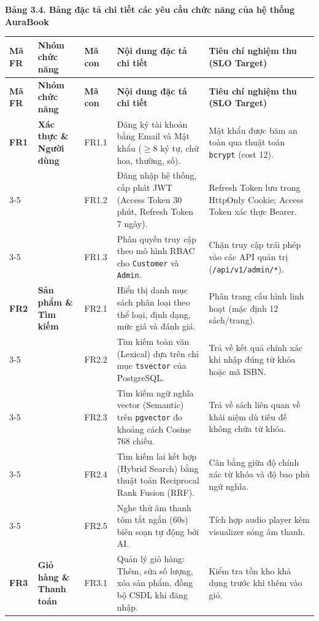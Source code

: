 \documentclass[11pt, a4paper]{report}
\begin{document}
\vspace{0.3cm}
\noindent\textbf{Bảng 3.4. Bảng đặc tả chi tiết các yêu cầu chức năng của hệ thống AuraBook}

\begin{longtable}{p{1.0cm} p{3.0cm} p{1.0cm} p{5.0cm} p{4.0cm}}
\toprule
\textbf{Mã FR} & \textbf{Nhóm chức năng} & \textbf{Mã con} & \textbf{Nội dung đặc tả chi tiết} & \textbf{Tiêu chí nghiệm thu (SLO Target)} \\
\midrule
\endfirsthead
\toprule
\textbf{Mã FR} & \textbf{Nhóm chức năng} & \textbf{Mã con} & \textbf{Nội dung đặc tả chi tiết} & \textbf{Tiêu chí nghiệm thu (SLO Target)} \\
\midrule
\endhead
\bottomrule
\endfoot
\textbf{FR1} & \textbf{Xác thực \& Người dùng} & FR1.1 & Đăng ký tài khoản bằng Email và Mật khẩu ($\ge 8$ ký tự, chữ hoa, thường, số). & Mật khẩu được băm an toàn qua thuật toán \texttt{bcrypt} (cost 12). \\
\cmidrule{3-5}
& & FR1.2 & Đăng nhập hệ thống, cấp phát JWT (Access Token 30 phút, Refresh Token 7 ngày). & Refresh Token lưu trong HttpOnly Cookie; Access Token xác thực Bearer. \\
\cmidrule{3-5}
& & FR1.3 & Phân quyền truy cập theo mô hình RBAC cho \texttt{Customer} và \texttt{Admin}. & Chặn truy cập trái phép vào các API quản trị (\texttt{/api/v1/admin/*}). \\
\midrule
\textbf{FR2} & \textbf{Sản phẩm \& Tìm kiếm} & FR2.1 & Hiển thị danh mục sách phân loại theo thể loại, định dạng, mức giá và đánh giá. & Phân trang cấu hình linh hoạt (mặc định 12 sách/trang). \\
\cmidrule{3-5}
& & FR2.2 & Tìm kiếm toàn văn (Lexical) dựa trên chỉ mục \texttt{tsvector} của PostgreSQL. & Trả về kết quả chính xác khi nhập đúng từ khóa hoặc mã ISBN. \\
\cmidrule{3-5}
& & FR2.3 & Tìm kiếm ngữ nghĩa vector (Semantic) trên \texttt{pgvector} đo khoảng cách Cosine 768 chiều. & Trả về sách liên quan về khái niệm dù tiêu đề không chứa từ khóa. \\
\cmidrule{3-5}
& & FR2.4 & Tìm kiếm lai kết hợp (Hybrid Search) bằng thuật toán Reciprocal Rank Fusion (RRF). & Cân bằng giữa độ chính xác từ khóa và độ bao phủ ngữ nghĩa. \\
\cmidrule{3-5}
& & FR2.5 & Nghe thử âm thanh tóm tắt ngắn ($60\text{s}$) biên soạn tự động bởi AI. & Tích hợp audio player kèm visualizer sóng âm thanh. \\
\midrule
\textbf{FR3} & \textbf{Giỏ hàng \& Thanh toán} & FR3.1 & Quản lý giỏ hàng: Thêm, sửa số lượng, xóa sản phẩm, đồng bộ CSDL khi đăng nhập. & Kiểm tra tồn kho khả dụng trước khi thêm vào giỏ. \\

\end{longtable}
\end{document}
